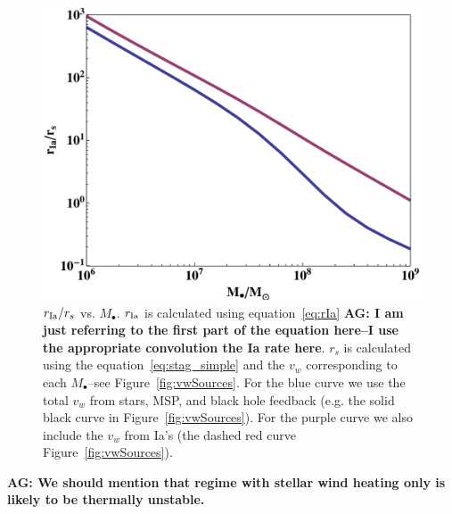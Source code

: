 \documentclass[usenatbib,fleqn]{mn2e}
\newcommand\lsim{\mathrel{\rlap{\lower4pt\hbox{\hskip1pt$\sim$}}
    \raise1pt\hbox{$<$}}}
\newcommand{\rs}{r_s}
\newcommand{\Mbh}[1][]{M_{\bullet#1}}
\newcommand{\rIa}{r_{\rm Ia}}
\newcommand{\vwO}{v_{w}}
\newcommand{\tage}{t_{\star}}
\begin{document}
\begin{figure}
\includegraphics[width=\columnwidth]{rs_rIa.pdf}
\caption{\label{fig:rs_rIa} $\rIa/\rs$ vs. $\Mbh$. $\rIa$ is
  calculated using equation~\eqref{eq:rIa} {\bf AG: I am just
    referring to the first part of the equation here--I use the
    appropriate convolution the Ia rate here}. $\rs$ is calculated
  using the equation~\eqref{eq:stag_simple} and the $\vwO$
  corresponding to each $\Mbh$--see Figure~\ref{fig:vwSources}. For
  the blue curve we use the total $\vwO$ from stars, MSP, and
  black hole feedback (e.g. the solid black curve in
  Figure~\ref{fig:vwSources}). For the purple curve we also include
  the $\vwO$ from Ia's (the dashed red curve
  Figure~\ref{fig:vwSources}).}
\end{figure}

{\bf AG: We should mention that regime with stellar wind heating only
  is likely to be thermally unstable.}
\end{document}
